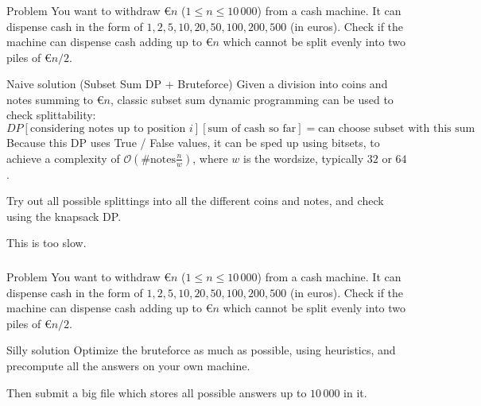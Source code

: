 \begin{frame}
    \frametitle{\problemtitle}
    \begin{block}{Problem}
        You want to withdraw €$n$ ($1 \leq n \leq 10\,000$) from a cash machine. It can dispense cash in the form of $1,2,5,10,20,50,100,200,500$ (in euros).
        Check if the machine can dispense cash adding up to €$n$ which cannot be split evenly into two piles of €$n/2$.
    \end{block}
    \pause
    \begin{block}{Naive solution (Subset Sum DP + Bruteforce)}
        Given a division into coins and notes summing to €$n$, classic subset sum dynamic programming can be used to check splittability:
            $$DP[\text{considering notes up to position } i][\text{sum of cash so far}] = \text{can choose subset with this sum}$$
        Because this DP uses True / False values, it can be sped up using bitsets, to achieve a complexity of $\mathcal O( \text{\# notes} \frac{n}{w})$, where $w$ is the wordsize, typically $32$ or $64$.

        \pause
        Try out all possible splittings into all the different coins and notes, and check using the knapsack DP.

            This is too slow.
    \end{block}
\end{frame}

\begin{frame}
    \frametitle{\problemtitle}
    \begin{block}{Problem}
        You want to withdraw €$n$ ($1 \leq n \leq 10\,000$) from a cash machine. It can dispense cash in the form of $1,2,5,10,20,50,100,200,500$ (in euros).
        Check if the machine can dispense cash adding up to €$n$ which cannot be split evenly into two piles of €$n/2$.
    \end{block}
    \begin{block}{Silly solution}
        Optimize the bruteforce as much as possible, using heuristics, and precompute all the answers on your own machine.

        Then submit a big file which stores all possible answers up to $10\,000$ in it.
    \end{block}
\end{frame}

